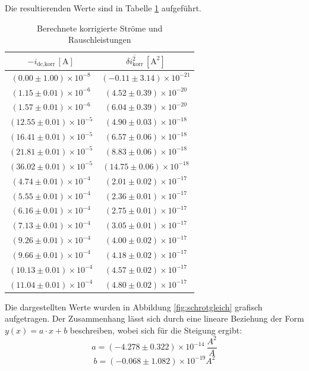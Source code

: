 Die resultierenden Werte sind in Tabelle \ref{tab:Schrotg} aufgeführt.

\FloatBarrier
\begin{table}[]
    \centering
    \begin{tabular}{c|c}
        \(-i_{\text{dc,korr}}\, [\text{A}]\) & \(\overline{\delta i_{\text{korr}}^2}\, [\text{A}^2]\) \\
        \hline
        \((0.00 \pm 1.00) \times 10^{-8}\) & \((-0.11 \pm 3.14) \times 10^{-21}\) \\
        \((1.15 \pm 0.01) \times 10^{-6}\) & \((4.52 \pm 0.39) \times 10^{-20}\) \\
        \((1.57 \pm 0.01) \times 10^{-6}\) & \((6.04 \pm 0.39) \times 10^{-20}\) \\
        \((12.55 \pm 0.01) \times 10^{-5}\) & \((4.90 \pm 0.03) \times 10^{-18}\) \\
        \((16.41 \pm 0.01) \times 10^{-5}\) & \((6.57 \pm 0.06) \times 10^{-18}\) \\
        \((21.81 \pm 0.01) \times 10^{-5}\) & \((8.83 \pm 0.06) \times 10^{-18}\) \\
        \((36.02 \pm 0.01) \times 10^{-5}\) & \((14.75 \pm 0.06) \times 10^{-18}\) \\
        \((4.74 \pm 0.01) \times 10^{-4}\)  & \((2.01 \pm 0.02) \times 10^{-17}\) \\
        \((5.55 \pm 0.01) \times 10^{-4}\)  & \((2.36 \pm 0.01) \times 10^{-17}\) \\
        \((6.16 \pm 0.01)\times 10^{-4}\)  & \((2.75 \pm 0.01) \times 10^{-17}\) \\
        \((7.13 \pm 0.01) \times 10^{-4}\)  & \((3.05 \pm 0.01) \times 10^{-17}\) \\
        \((9.26 \pm 0.01) \times 10^{-4}\)  & \((4.00 \pm 0.02) \times 10^{-17}\) \\
        \((9.66 \pm 0.01) \times 10^{-4}\)  & \((4.18 \pm 0.02)\times 10^{-17}\) \\
        \((10.13 \pm 0.01) \times 10^{-4}\) & \((4.57 \pm 0.02) \times 10^{-17}\) \\
        \((11.04 \pm 0.01) \times10^{-4}\) & \((4.80 \pm 0.02)\times 10^{-17}\) \\
        
    \end{tabular}
    \caption{Berechnete korrigierte Ströme und Rauschleistungen}
    \label{tab:Schrotg}
\end{table}
\FloatBarrier

Die dargestellten Werte wurden in Abbildung \ref{fig:schrotgleich} grafisch aufgetragen. Der Zusammenhang lässt sich durch eine lineare Beziehung der Form \(y(x) = a \cdot x + b\) beschreiben, wobei sich für die Steigung ergibt:
\begin{equation*}
    a = (-4.278 \pm 0.322) \times 10^{-14}~\si{\frac{A^2}{A}} 
\end{equation*}
\begin{equation*}
    b = (-0.068 \pm 1.082) \times 10^{-19} \si{A}^2
\end{equation*}

